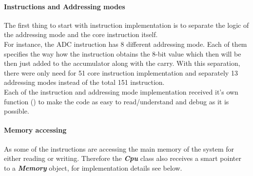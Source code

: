 \documentclass[]{report}
\begin{document}
\paragraph{Instructions and Addressing modes}
The first thing to start with instruction implementation is to separate the logic of the addressing mode and the core instruction itself.
\\
For instance, the ADC instruction has 8 different addressing mode. Each of them specifies the way how the instruction obtains the 8-bit value which then will be then just added to the accumulator along with the carry. 
With this separation, there were only need for 51 core instruction implementation and separately 13 addressing modes instead of the total 151 instruction. 
\\
Each of the instruction and addressing mode implementation received it's own function (\cite{DCPU}) to make the code as easy to read/understand and debug as it is possible.

\paragraph{Memory accessing}
As some of the instructions are accessing the main memory of the system for either reading or writing. Therefore  the  \textbf{\textit{Cpu}} class also receives a smart pointer to a \textbf{\textit{Memory}} object, for implementation details see below.
\end{document}
